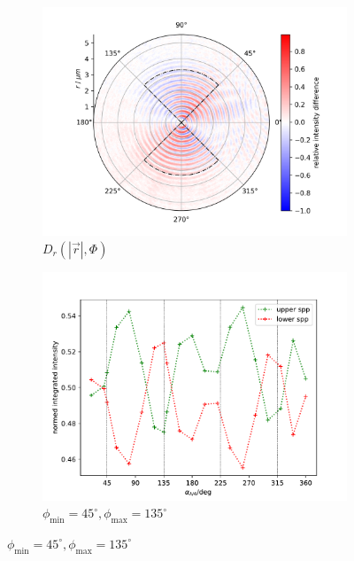 \documentclass[titlepage,  ngerman]{article}
\begin{document}
\begin{figure}
			\begin{subfigure}[b]{0.5\textwidth}
				\centering
				\includegraphics[width=\textwidth]{figures/fp/fp_mid.png}
				\caption{$D_r\left(|\vec{r}|, \Phi\right)$}
				\label{fig:diff_fp_45_135_mid}
			\end{subfigure}
			\hfill
			\begin{subfigure}[b]{0.49\textwidth}
				\centering
				\includegraphics[width=\textwidth]{figures/fp/fp_mid_int.pdf}
				\caption{ $\phi_\mathrm{min} =45^\circ, \phi_\mathrm{max}=135^\circ$}
				\label{fig:int_fp_45_135_mid}
			\end{subfigure}
			

\end{figure}
\end{document}
